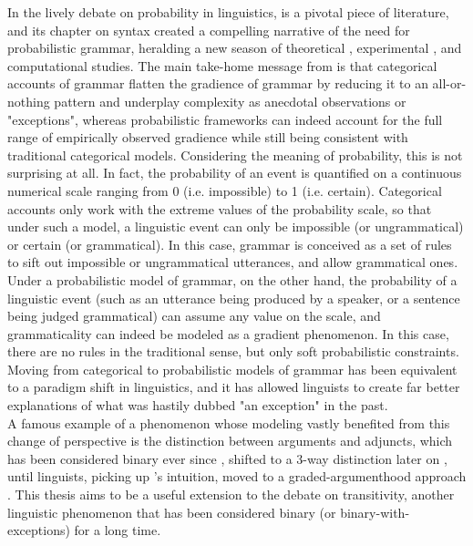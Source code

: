 In the lively debate on probability in linguistics, \textcite{bod2003probabilistic} is a pivotal piece of literature, and its chapter on syntax \parencite{manning2003probabilistic} created a compelling narrative of the need for probabilistic grammar, heralding a new season of theoretical \parencite{wasow2007gradient, CrockerKeller2006}, experimental \parencite{KellerSorace2003, bresnan2007probabilistic, BresnanHay2008, SoraceKeller2005, AlexopoulouKeller2006}, and computational \parencite{TurneyPantel2010} studies. The main take-home message from \textcite{manning2003probabilistic} is that categorical accounts of grammar flatten the gradience of grammar by reducing it to an all-or-nothing pattern and underplay complexity as anecdotal observations or "exceptions", whereas probabilistic frameworks can indeed account for the full range of empirically observed gradience while still being consistent with traditional categorical models. Considering the meaning of probability, this is not surprising at all. In fact, the probability of an event is quantified on a continuous numerical scale ranging from 0 (i.e. impossible) to 1 (i.e. certain). Categorical accounts only work with the extreme values of the probability scale, so that under such a model, a linguistic event can only be impossible (or ungrammatical) or certain (or grammatical). In this case, grammar is conceived as a set of rules to sift out impossible or ungrammatical utterances, and allow grammatical ones. Under a probabilistic model of grammar, on the other hand, the probability of a linguistic event (such as an utterance being produced by a speaker, or a sentence being judged grammatical) can assume any value on the scale, and grammaticality can indeed be modeled as a gradient phenomenon. In this case, there are no rules in the traditional sense, but only soft probabilistic constraints. Moving from categorical to probabilistic models of grammar has been equivalent to a paradigm shift in linguistics, and it has allowed linguists to create far better explanations of what was hastily dubbed "an exception" in the past.\\
A famous example of a phenomenon whose modeling vastly benefited from this change of perspective is the distinction between arguments and adjuncts, which has been considered binary ever since \textcite{tesniere2015elements}, shifted to a 3-way distinction later on \parencite{vanvalinlapolla1997syntax, Dowty2003, AldezabalEtAl2002, Villavicencio2002}, until linguists, picking up \textcite{vater1978possibility}'s intuition, moved to a graded-argumenthood approach \parencite{CennamoLenci2019, KimEtAl2019, KimEtAl2019a, KimEtAl2018}. This thesis aims to be a useful extension to the debate on transitivity, another linguistic phenomenon that has been considered binary (or binary-with-exceptions) for a long time.
